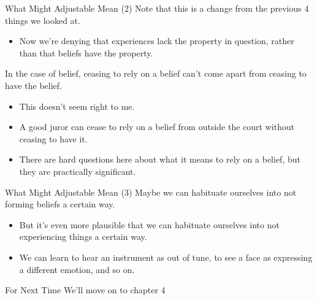 \documentclass[
  17pt,
  letterpaper,
  ignorenonframetext,
  aspectratio=169,
  handout,
  xcolor={dvipsnames}]{beamer}
\providecommand{\tightlist}{%
  \setlength{\itemsep}{0pt}\setlength{\parskip}{0pt}}\usepackage{longtable,booktabs,array}
\begin{document}
\begin{frame}{What Might Adjustable Mean (2)}
\protect\hypertarget{what-might-adjustable-mean-2-1}{}
Note that this is a change from the previous 4 things we looked at.

\begin{itemize}[<+->]
\tightlist
\item
  Now we're denying that experiences lack the property in question,
  rather than that beliefs have the property.
\end{itemize}

\end{frame} \begin{frame}[plain]

In the case of belief, ceasing to rely on a belief can't come apart from
ceasing to have the belief.

\begin{itemize}[<+->]
\tightlist
\item
  This doesn't seem right to me.
\item
  A good juror can cease to rely on a belief from outside the court
  without ceasing to have it.
\item
  There are hard questions here about what it means to rely on a belief,
  but they are practically significant.
\end{itemize}
\end{frame}

\begin{frame}{What Might Adjustable Mean (3)}
\protect\hypertarget{what-might-adjustable-mean-3}{}
Maybe we can habituate ourselves into not forming beliefs a certain way.

\begin{itemize}[<+->]
\tightlist
\item
  But it's even more plausible that we can habituate ourselves into not
  experiencing things a certain way.
\item
  We can learn to hear an instrument as out of tune, to see a face as
  expressing a different emotion, and so on.
\end{itemize}
\end{frame}

\begin{frame}{For Next Time}
\protect\hypertarget{for-next-time}{}
We'll move on to chapter 4
\end{frame}
\end{document}
